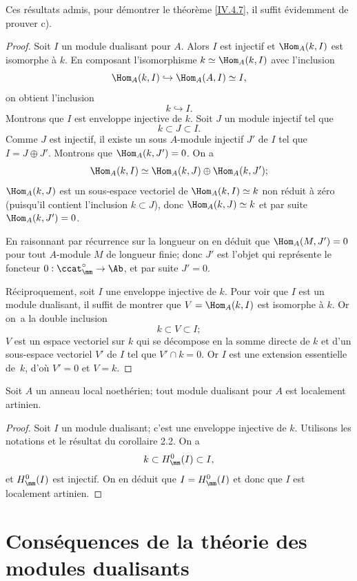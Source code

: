Ces r\'esultats admis, pour d\'emontrer le th\'eor\`eme \ref{IV.4.7}, il suffit \'evidemment de prouver c).

\begin{proof}
Soit $I$ un module dualisant pour $A$. Alors $I$ est injectif et $\Hom_{A}(k, I)$ est isomorphe \`a $k$. En composant l'isomorphisme $k\simeq \Hom_{A}(k, I)$ avec l'inclusion
$$
\Hom_{A}(k, I)\hookrightarrow \Hom_{A}(A, I)\simeq I,
$$
on obtient l'inclusion
$$
k\hookrightarrow I.
$$
Montrons que $I$ est enveloppe injective de $k$. Soit $J$ un module injectif tel que
$$
k\subset J\subset I.
$$
Comme $J$ est injectif, il existe un sous $A$-module injectif $J'$ de $I$ tel que $I=J\oplus J'$. Montrons que $\Hom_{A}(k, J')=0$. On a
$$
\Hom_{A}(k, I)\simeq \Hom_{A}(k, J)\oplus \Hom_{A}(k, J');
$$
$\Hom_{A}(k, J)$ est un sous-espace vectoriel de $\Hom_{A}(k, I)\simeq k$ non r\'eduit \`a z\'ero (puisqu'il contient l'inclusion $k\subset J$), donc $\Hom_{A}(k, J)\simeq k$ et par suite $\Hom_{A}(k, J')=0$.

En raisonnant par r\'ecurrence sur la longueur on en d\'eduit que $\Hom_{A}(M, J')=0$ pour tout $A$-module $M$ de longueur finie; donc $J'$ est l'objet qui repr\'esente le foncteur $0:\ccat_{\mm}^{\circ}\to \Ab$, et par suite $J'=0$.

R\'eciproquement, soit $I$ une enveloppe injective de $k$. Pour voir que $I$ est un module dualisant, il suffit de montrer \ignorespaces que $V=\Hom_{A}(k, I)$ est isomorphe \`a $k$. Or on~a la double inclusion
$$
k\subset V\subset I;
$$
$V$ est un espace vectoriel sur $k$ qui se d\'ecompose en la somme directe de $k$ et d'un sous-espace vectoriel $V'$ de $I$ tel que $V'\cap k=0$. Or $I$ est une extension essentielle de~$k$, d'o\`u $V'=0$ et $V=k$.
\skipqed
\end{proof}

\begin{corollaire} \label{IV.4.9}
Soit $A$ un anneau local noeth\'erien; tout module dualisant pour $A$ est localement artinien.
\end{corollaire}

\begin{proof}
Soit $I$ un module dualisant; c'est une enveloppe injective de $k$. Utilisons les notations et le r\'esultat du corollaire 2.2. On a
$$
k\subset H^{0}_{\mm}(I)\subset I,
$$
et $H^{0}_{\mm}(I)$ est injectif. On en d\'eduit que $I=H^{0}_{\mm}(I)$ et donc que $I$ est localement artinien.
\skipqed
\end{proof}

\section{Cons\'equences de la th\'eorie des modules dualisants} \label{IV.5}

